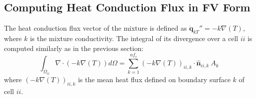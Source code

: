 \subsection{Computing Heat Conduction Flux in FV Form}


The heat conduction flux vector of the mixture is defined as $\dot{\mathbf{q}}_{kT}''= -k \nabla(T)$, where $k$ is the mixture conductivity. The integral of its divergence over a cell $ii$ is computed similarly as in the previous section:
\begin{equation}
    \int_{\Omega_{ii}} {\nabla \cdot \left(-k \nabla(T)\right)} d\Omega = \sum_{k=1}^{nf_c} \left(-k \nabla(T) \right)_{ii,k} \cdot \hat{\mathbf{n}}_{ii,k}  \: A_k
\end{equation}
where $\left(-k \nabla(T) \right)_{ii,k}$ is the mean heat flux defined on boundary surface $k$ of cell $ii$.


